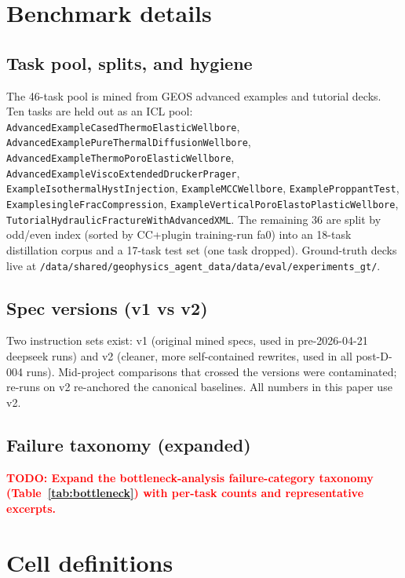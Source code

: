 \documentclass{article}
\newcommand{\todo}[1]{\textcolor{red}{\textbf{TODO: #1}}}
\begin{document}

\appendix

\section{Benchmark details}
\label{app:bench}

\subsection{Task pool, splits, and hygiene}
The 46-task pool is mined from GEOS advanced examples and tutorial decks. Ten tasks are held out as an ICL pool: \texttt{AdvancedExampleCasedThermoElasticWellbore}, \texttt{AdvancedExamplePureThermalDiffusionWellbore}, \texttt{AdvancedExampleThermoPoroElasticWellbore}, \texttt{AdvancedExampleViscoExtendedDruckerPrager}, \texttt{ExampleIsothermalHystInjection}, \texttt{ExampleMCCWellbore}, \texttt{ExampleProppantTest}, \texttt{ExamplesingleFracCompression}, \texttt{ExampleVerticalPoroElastoPlasticWellbore}, \texttt{TutorialHydraulicFractureWithAdvancedXML}. The remaining 36 are split by odd/even index (sorted by CC+plugin training-run fa0) into an 18-task distillation corpus and a 17-task test set (one task dropped). Ground-truth decks live at \texttt{/data/shared/geophysics\_agent\_data/data/eval/experiments\_gt/}.

\subsection{Spec versions (v1 vs v2)}
Two instruction sets exist: v1 (original mined specs, used in pre-2026-04-21 deepseek runs) and v2 (cleaner, more self-contained rewrites, used in all post-D-004 runs). Mid-project comparisons that crossed the versions were contaminated; re-runs on v2 re-anchored the canonical baselines. All numbers in this paper use v2.

\subsection{Failure taxonomy (expanded)}
\label{app:failures}

\todo{Expand the bottleneck-analysis failure-category taxonomy (Table~\ref{tab:bottleneck}) with per-task counts and representative excerpts.}

\section{Cell definitions}
\label{app:cells}
\end{document}
